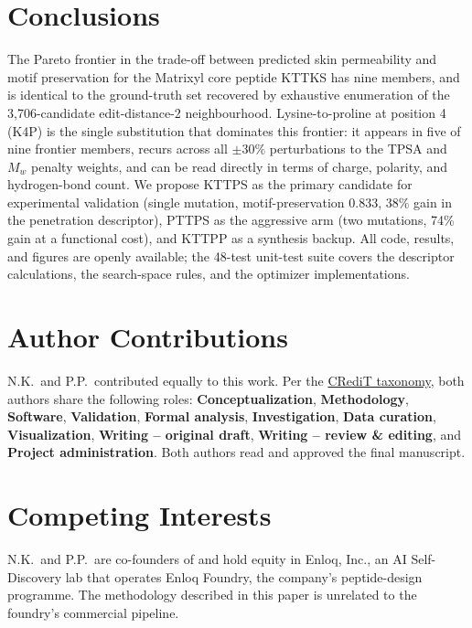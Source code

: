 \documentclass[11pt,letterpaper]{article}
\begin{document}
\section{Conclusions}

The Pareto frontier in the trade-off between predicted skin permeability and motif preservation for the Matrixyl core peptide KTTKS has nine members, and is identical to the ground-truth set recovered by exhaustive enumeration of the 3,706-candidate edit-distance-2 neighbourhood. Lysine-to-proline at position 4 (K4P) is the single substitution that dominates this frontier: it appears in five of nine frontier members, recurs across all $\pm 30\%$ perturbations to the TPSA and $M_w$ penalty weights, and can be read directly in terms of charge, polarity, and hydrogen-bond count. We propose KTTPS as the primary candidate for experimental validation (single mutation, motif-preservation 0.833, 38\% gain in the penetration descriptor), PTTPS as the aggressive arm (two mutations, 74\% gain at a functional cost), and KTTPP as a synthesis backup. All code, results, and figures are openly available; the 48-test unit-test suite covers the descriptor calculations, the search-space rules, and the optimizer implementations.


\section*{Author Contributions}

N.K.\ and P.P.\ contributed equally to this work. Per the \href{https://credit.niso.org/}{CRediT taxonomy}, both authors share the following roles:
\textbf{Conceptualization}, \textbf{Methodology}, \textbf{Software}, \textbf{Validation}, \textbf{Formal analysis}, \textbf{Investigation}, \textbf{Data curation}, \textbf{Visualization}, \textbf{Writing -- original draft}, \textbf{Writing -- review \& editing}, and \textbf{Project administration}. Both authors read and approved the final manuscript.

\section*{Competing Interests}

N.K.\ and P.P.\ are co-founders of and hold equity in Enloq, Inc., an AI Self-Discovery lab that operates Enloq Foundry, the company's peptide-design programme. The methodology described in this paper is unrelated to the foundry's commercial pipeline.
\end{document}
